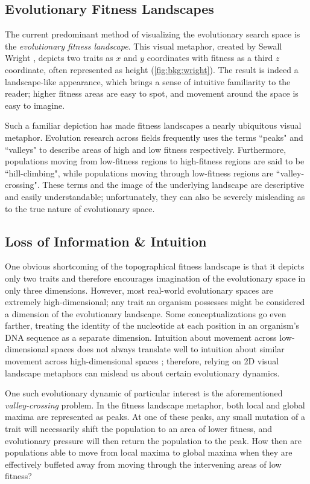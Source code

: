 \subsection{Evolutionary Fitness Landscapes}
The current predominant method of visualizing the evolutionary search space is the \textit{evolutionary fitness landscape}. 
This visual metaphor, created by Sewall Wright \citep{wright_roles_1932}, depicts two traits as $x$ and $y$ coordinates with fitness as a third $z$ coordinate, often represented as height (\autoref{fig:bkg:wright}). 
The result is indeed a landscape-like appearance, which brings a sense of intuitive familiarity to the reader; higher fitness areas are easy to spot, and movement around the space is easy to imagine. 

Such a familiar depiction has made fitness landscapes a nearly ubiquitous visual metaphor. 
Evolution research across fields frequently uses the terms ``peaks" and ``valleys" to describe areas of high and low fitness respectively. 
Furthermore, populations moving from low-fitness regions to high-fitness regions are said to be ``hill-climbing", while populations moving through low-fitness regions are ``valley-crossing". 
These terms and the image of the underlying landscape are descriptive and easily understandable; unfortunately, they can also be severely misleading as to the true nature of evolutionary space.

\subsection{Loss of Information \& Intuition}

One obvious shortcoming of the topographical fitness landscape is that it depicts only two traits and therefore encourages imagination of the evolutionary space in only three dimensions. 
However, most real-world evolutionary spaces are extremely high-dimensional; any trait an organism possesses might be considered a dimension of the evolutionary landscape. 
Some conceptualizations go even farther, treating the identity of the nucleotide at each position in an organism's DNA sequence as a separate dimension. 
Intuition about movement across low-dimensional spaces does not always translate well to intuition about similar movement across high-dimensional spaces \citep{agarwala_adaptive_2019}; therefore, relying on 2D visual landscape metaphors can mislead us about certain evolutionary dynamics.

One such evolutionary dynamic of particular interest is the aforementioned \textit{valley-crossing} problem. In the fitness landscape metaphor, both local and global maxima are represented as peaks. At one of these peaks, any small mutation of a trait will necessarily shift the population to an area of lower fitness, and evolutionary pressure will then return the population to the peak. How then are populations able to move from local maxima to global maxima when they are effectively buffeted away from moving through the intervening areas of low fitness?

